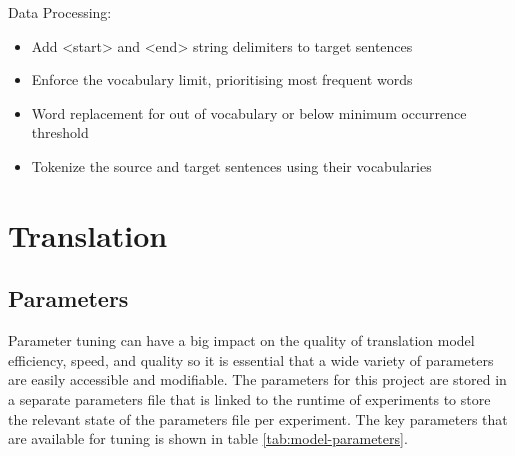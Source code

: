 Data Processing:
\begin{itemize}
    \item Add <start> and <end> string delimiters to target sentences
    \item Enforce the vocabulary limit, prioritising most frequent words
    \item Word replacement for out of vocabulary or below minimum occurrence threshold
    \item Tokenize the source and target sentences using their vocabularies
\end{itemize}

\newpage
\section{Translation}

\subsection{Parameters}

Parameter tuning can have a big impact on the quality of translation model efficiency, speed, and quality so it is essential that a wide variety of parameters are easily accessible and modifiable. The parameters for this project are stored in a separate parameters file that is linked to the runtime of experiments to store the relevant state of the parameters file per experiment. The key parameters that are available for tuning is shown in table \ref{tab:model-parameters}.



